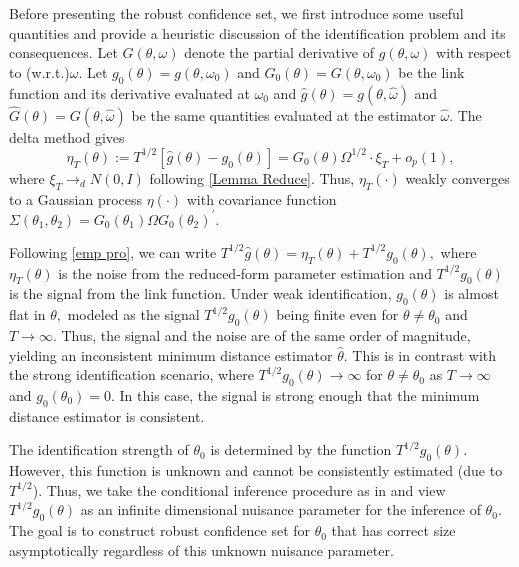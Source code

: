 Before presenting the robust confidence set, we first introduce some useful quantities and provide a heuristic discussion of the identification problem and its consequences. Let $G(\theta ,\omega )$ denote the partial derivative of $ g(\theta ,\omega )$ with respect to (w.r.t.)\@ $\omega .$ Let $g_{0}(\theta )=g(\theta ,\omega _{0})$ and $G_{0}(\theta )=G(\theta ,\omega _{0})$ be the link function and its derivative evaluated at $\omega _{0}$ and $\widehat{g}(\theta
)=g(\theta ,\widehat{\omega })$ and $\widehat{G}(\theta )=G(\theta , \widehat{\omega })$ be the same quantities evaluated at the estimator $ \widehat{\omega }.$ The delta method gives 
%
\begin{equation}
    \eta _{T}(\theta ):=T^{1/2}\left[ \widehat{g}(\theta )-g_{0}(\theta ) \right] =G_{0}(\theta )\Omega ^{1/2}\cdot \xi _{T}+o_{p}(1),
    \label{emp pro}
\end{equation}
%
where $\xi _{T}\rightarrow _{d}N(0,I)$ following \cref{Lemma Reduce}.  Thus, $\eta _{T}(\cdot )$ weakly converges to a Gaussian process $\eta (\cdot )$ with covariance function $\Sigma (\theta _{1},\theta _{2})=G_{0}(\theta _{1})\Omega G_{0}(\theta _{2})^{\prime }.$

Following \cref{emp pro}, we can write $T^{1/2}\widehat{g}(\theta )=\eta _{T}(\theta )+T^{1/2}g_{0}(\theta ),$ where $\eta _{T}(\theta )$ is the noise from the reduced-form parameter estimation and $T^{1/2}g_{0}(\theta )$ is the signal from the link function. Under weak identification, $ g_{0}(\theta )$ is almost flat in $\theta ,$ modeled as the signal $ T^{1/2}g_{0}(\theta )$ being finite even for $\theta \neq \theta _{0}$ and $T\rightarrow \infty .$ Thus, the signal and the noise are of the same order of magnitude, yielding an inconsistent minimum distance estimator $ \widehat{\theta }.$ This is in contrast with the strong identification scenario, where $T^{1/2}g_{0}(\theta )\rightarrow \infty $ for $\theta \neq \theta _{0}$ as $T\rightarrow \infty $ and $g_{0}(\theta _{0})=0.$ In this case, the signal is strong enough that the minimum distance estimator is consistent.

The identification strength of $\theta _{0}$ is determined by the function $ T^{1/2}g_{0}(\theta ).$ However, this function is unknown and cannot be consistently estimated (due to $T^{1/2}$). Thus, we take the conditional inference procedure as in \textcite{andrews2016conditional} and view $ T^{1/2}g_{0}(\theta )$ as an infinite dimensional nuisance parameter for the inference of $\theta _{0}$. The goal is to construct robust confidence set for $\theta _{0}$ that has correct size asymptotically regardless of this unknown nuisance parameter.

